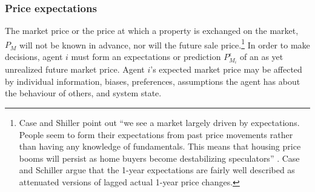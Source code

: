 {\subsubsection{Price expectations}
The \gls{market price} or the price at which a property is exchanged on the market, $P_M$ will not be known in advance, nor will the future sale price.\footnote{Case and Shiller point out ``we see a market largely driven by expectations. People seem to form their expectations from past price movements rather than having any knowledge of fundamentals. This means that housing price booms will persist as home buyers become destabilizing speculators''  \cite{caseThereBubbleHousing2003}. Case and Schiller\cite{caseThereBubbleHousing2003} argue that  the 1-year expectations are fairly well described as attenuated versions of lagged actual 1-year price changes.}  In order to make decisions, agent $i$ must form an \glspl{expectation} or prediction $P_{M_i}^{\epsilon}$ of an as yet unrealized future market price. Agent $i$'s expected market price may be affected by individual information, biases, preferences, assumptions the agent has about the behaviour of others, and system state.  



}
